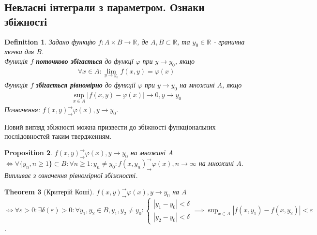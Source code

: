 \documentclass[a4paper, 10pt]{article}
\def\huge{\displaystyle}
\theoremstyle{theoremdd}
\newtheorem{theorem}{Theorem}[subsection]
\theoremstyle{theoremdd}
\theoremstyle{theoremdd}
\newtheorem{definition}[theorem]{Definition}
\theoremstyle{theoremdd}
\theoremstyle{theoremdd}
\theoremstyle{theoremdd}
\newtheorem{proposition}[theorem]{Proposition}
\theoremstyle{theoremdd}
\theoremstyle{theoremdd}
\theoremstyle{theoremdd}
\begin{document}
\subsection{Невласні інтеграли з параметром. Ознаки збіжності}
\begin{definition}
Задано функцію $f: A \times B \to \mathbb{R}$, де $A,B \subset \mathbb{R}$, та $y_0 \in \mathbb{R}$ - гранична точка для $B$.\\
Функція $f$ \textbf{поточково збігається} до функцї $\varphi$ при $y \to y_0$, якщо
\begin{align*}
\forall x \in A: \lim_{y \to y_0} f(x,y) = \varphi(x)
\end{align*}
Функція $f$ \textbf{збігається рівномірно} до функції $\varphi$ при $y \to y_0$ на множині $A$, якщо
\begin{align*}
\huge\sup_{x \in A} |f(x,y) - \varphi(x)| \to 0, y \to y_0
\end{align*}
Позначення: $f(x,y)^\rightarrow_\rightarrow \varphi(x), y \to y_0$.
\end{definition}

Новий вигляд збіжності можна призвести до збіжності функціональних послідовностей таким твердженням.

\begin{proposition}
$f(x,y)^\rightarrow_\rightarrow \varphi(x), y \to y_0$ на множині $A$ $\iff \forall \{y_n, n \geq 1\} \subset B: \forall n \geq 1: y_n \neq y_0: f(x,y_n)^\rightarrow_\rightarrow \varphi(x), n \to \infty$ на множині $A$.\\
\textit{Випливає з означення рівномірної збіжності.}
\end{proposition}

\begin{theorem}[Критерій Коші]
$f(x,y)^\rightarrow_\rightarrow \varphi(x), y \to y_0$ на $A$ $\iff \forall \varepsilon > 0: \exists \delta(\varepsilon) > 0: \forall y_1,y_2 \in B, y_1,y_2 \neq y_0: \begin{cases} |y_1-y_0| < \delta \\ |y_2-y_0| < \delta \end{cases} \implies \huge\sup_{x \in A} |f(x,y_1)-f(x,y_2)| < \varepsilon$.\\
\end{theorem}
\end{document}
